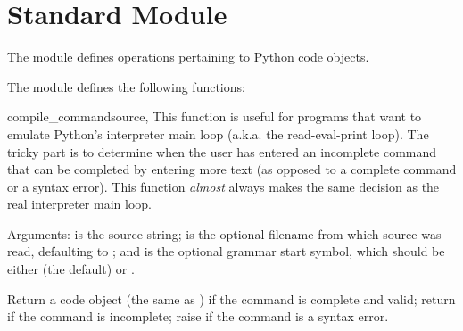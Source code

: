 \section{Standard Module }
\label{module-code}

The  module defines operations pertaining to Python code
objects.

The  module defines the following functions:


\begin{funcdesc}{compile_command}{source, }
This function is useful for programs that want to emulate Python's
interpreter main loop (a.k.a. the read-eval-print loop).  The tricky
part is to determine when the user has entered an incomplete command
that can be completed by entering more text (as opposed to a complete
command or a syntax error).  This function \emph{almost} always makes
the same decision as the real interpreter main loop.

Arguments:  is the source string;  is the
optional filename from which source was read, defaulting to
; and  is the optional grammar start
symbol, which should be either  (the default) or
.

Return a code object (the same as ) if the command is complete and valid;
return  if the command is incomplete; raise
 if the command is a syntax error.


\end{funcdesc}
